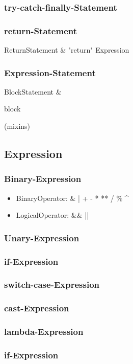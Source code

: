 \subsubsection{try-catch-finally-Statement}
\subsubsection{return-Statement}
\begin{ebnf}
ReturnStatement & \rightarrow "return" Expression \\
\end{ebnf}

\subsubsection{Expression-Statement}
\begin{ebnf}
BlockStatement &  \\
\end{ebnf}

block

(mixins)

\subsection{Expression}


\subsubsection{Binary-Expression}
\begin{itemize}
\item BinaryOperator: \& | + - * ** / \% \textasciicircum{} 
\item LogicalOperator: \&\&  ||
\end{itemize}

\subsubsection{Unary-Expression}

\subsubsection{if-Expression}
\subsubsection{switch-case-Expression}
\subsubsection{cast-Expression}
\subsubsection{lambda-Expression}
\subsubsection{if-Expression}


